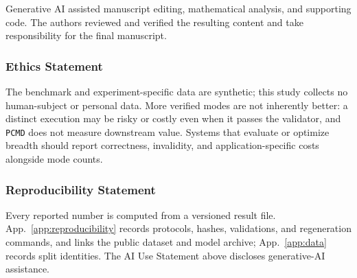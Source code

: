 \documentclass{article}
\newcommand{\1}{\mathbf 1}
\newcommand{\pmd}{\texttt{PCMD}}
\theoremstyle{remark}
\theoremstyle{definition}
\theoremstyle{plain}
\begin{document}
Generative AI assisted manuscript editing, mathematical analysis, and supporting code. The authors reviewed and verified the resulting content and take responsibility for the final manuscript.

\subsubsection*{Ethics Statement}

The benchmark and experiment-specific data are synthetic; this study collects
no human-subject or personal data. More verified modes are not inherently
better: a distinct execution may be risky or costly even when it passes the
validator, and \pmd{} does not measure downstream value. Systems
that evaluate or optimize breadth should report correctness, invalidity, and
application-specific costs alongside mode counts.

\subsubsection*{Reproducibility Statement}

Every reported number is computed from a versioned result file.
App.~\ref{app:reproducibility} records protocols, hashes, validations,
and regeneration commands, and links the public dataset and model archive;
App.~\ref{app:data} records split identities.
The AI Use Statement above discloses generative-AI assistance.


\clearpage
{}\label{sec:references}


\end{document}
